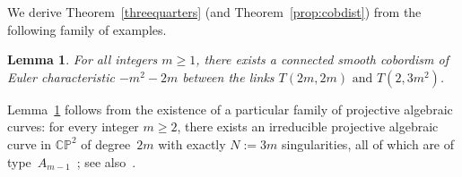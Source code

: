 \documentclass[10pt,a4paper]{article}
\newtheorem{lemm}[theo]{Lemma}
\theoremstyle{definition}
\numberwithin{equation}{section}
\newcommand*\C{\mathbb{C}}
\renewcommand*\P{\mathbb{P}}
\begin{document}
We derive Theorem~\ref{threequarters} (and Theorem~\ref{prop:cobdist}) from the following family of examples.

\begin{lemm}\label{lem:chiexact}
For all integers $m\geq 1$, there exists a connected smooth cobordism of Euler characteristic $-m^2-2m$ between the links $T(2m,2m)\text{ and } T(2,3m^2)$.
\end{lemm}

Lemma~\ref{lem:chiexact} follows from the existence of a particular family of projective algebraic curves: for every integer $m\geq 2$, there exists an irreducible projective algebraic curve in $\C\P^2$ of degree~$2m$ with exactly $N:= 3m$ singularities, all of which are of type~$A_{m-1}$~\cite[Theorem~2]{Hirano_92}; see also~\cite[Theorem~3.2]{GS08}.
\end{document}
